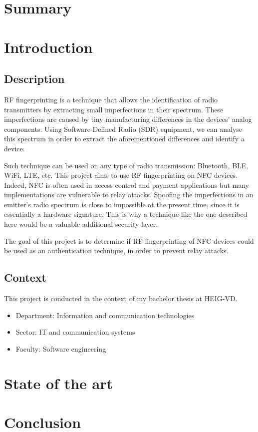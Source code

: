 \documentclass[paper=a4, fontsize=11pt]{scrartcl}
\begin{document}
\section{Summary} %

\section{Introduction}
\subsection{Description}
RF fingerprinting is a technique that allows the identification of radio transmitters by extracting small imperfections in their spectrum. These imperfections are caused by tiny manufacturing differences in the devices' analog components. Using Software-Defined Radio (SDR) equipment, we can analyse this spectrum in order to extract the aforementioned differences and identify a device.

Such technique can be used on any type of radio transmission: Bluetooth, BLE, WiFi, LTE, etc. This project aims to use RF fingerprinting on NFC devices. Indeed, NFC is often used in access control and payment applications but many implementations are vulnerable to relay attacks. Spoofing the imperfections in an emitter's radio spectrum is close to impossible at the present time, since it is essentially a hardware signature. This is why a technique like the one described here would be a valuable additional security layer.

The goal of this project is to determine if RF fingerprinting of NFC devices could be used as an authentication technique, in order to prevent relay attacks.

\subsection{Context}
This project is conducted in the context of my bachelor thesis at HEIG-VD.

\begin{itemize}
  \item Department: Information and communication technologies
  \item Sector: IT and communication systems
  \item Faculty: Software engineering
\end{itemize}

\section{State of the art}

\section{Conclusion}




\listoffigures

\listoftables


\end{document}
